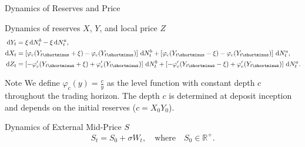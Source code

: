 \documentclass[10pt]{beamer}
\begin{document}
\begin{frame}{Dynamics of Reserves and Price}

\begin{block}{Dynamics of reserves $X$, $Y$, and local price $Z$}\pause
{}
	\vspace{-1em}
    \begin{equation}
    \begin{aligned}
    \text{d} Y_t &= \xi \, \text{d} N^b_t - \xi \, \text{d} N^a_t, \\
    \text{d} X_t &= \left[\varphi_c(Y_{t\shortminus} + \xi) - \varphi_c(Y_{t\shortminus})\right] \, \text{d} N^b_t + \left[\varphi_c(Y_{t\shortminus} - \xi) - \varphi_c(Y_{t\shortminus})\right] \, \text{d} N^a_t, \\
    \text{d} Z_t &= \left[- \varphi_c'(Y_{t\shortminus} + \xi) + \varphi_c'(Y_{t\shortminus})\right] \, \text{d} N^b_t + \left[- \varphi_c'(Y_{t\shortminus} - \xi) + \varphi_c'(Y_{t\shortminus})\right] \, \text{d} N^a_t. \nonumber
    \end{aligned}
    \end{equation}
\end{block}\pause

\begin{alertblock}{Note} We define $\varphi_c(y) = \frac{c}{y}$ as the level function with constant depth $c$ throughout the trading horizon. The depth $c$ is determined at deposit inception and depends on the initial reserves ($c = X_0 Y_0$).
\end{alertblock}\pause

\begin{block}{Dynamics of External Mid-Price $S$}\pause
    \begin{equation}
    S_t = S_0 + \sigma W_t, \quad \text{where} \quad S_0 \in \mathbb{R}^+. \nonumber
    \end{equation}
\end{block}

\end{frame}
\end{document}
